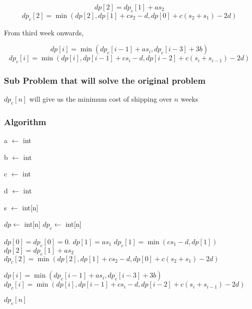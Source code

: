 \documentclass[12pt]{article}
\begin{document}
$$dp[2] = dp_c[1] + a s_2$$
$$dp_c[2] = \min(dp[2], dp[1] + c s_2 - d, dp[0] + c(s_2 + s_1) - 2 d)$$

From third week onwards, 

$$dp[i] = \min(dp_c[i-1] + a s_i, dp_c[i-3] + 3b)$$
$$dp_c[i] = \min(dp[i], dp[i-1] + c s_i - d, dp[i-2] + c(s_i + s_{i-1}) - 2 d)$$

\subsubsection{Sub Problem that will solve the original problem}

$dp_c[n]$ will give us the minimum cost of shipping over $n$ weeks

\pagebreak

\subsubsection{Algorithm}

\begin{algorithm}
    \begin{algorithmic}
        \Require a $\leftarrow$ int 

        \Require b $\leftarrow$ int 

        \Require c $\leftarrow$ int 

        \Require d $\leftarrow$ int 

        \Require s $\leftarrow$ int[n] 

        \State $dp \leftarrow$ int[n]
        \State $dp_c \leftarrow$ int[n]
        

        \State $dp[0] = dp_c[0] = 0$.
        \State $dp[1] = a s_1$
        \State $dp_c[1] = \min(c s_1 - d, dp[1])$
        \State $dp[2] = dp_c[1] + a s_2$
        \State $dp_c[2] = \min(dp[2], dp[1] + c s_2 - d, dp[0] + c(s_2 + s_1) - 2 d)$

            \State $dp[i] = \min(dp_c[i-1] + a s_i, dp_c[i-3] + 3b)$
            \State $dp_c[i] = \min(dp[i], dp[i-1] + c s_i - d, dp[i-2] + c(s_i + s_{i-1}) - 2 d)$
        
        \EndFor
        
        \Return $dp_c[n]$

        
        
    \end{algorithmic}
\end{algorithm}
\end{document}
